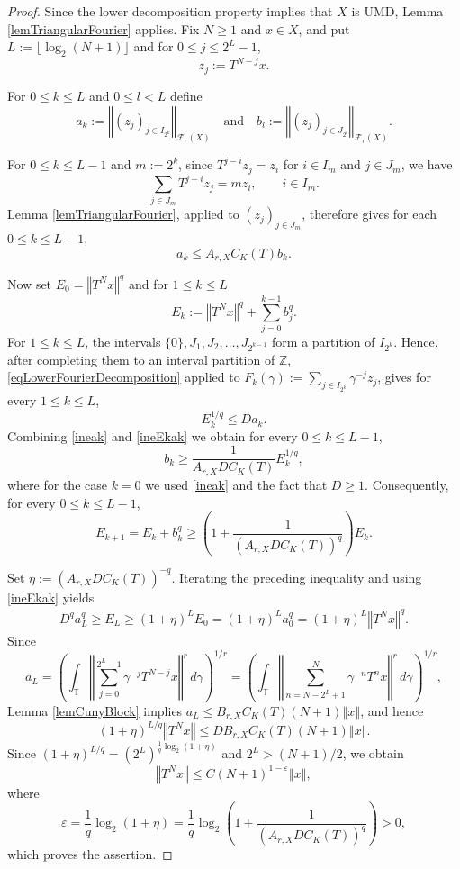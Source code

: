 \documentclass[12pt]{amsart}
\theoremstyle{plain}
\theoremstyle{remark}
\theoremstyle{definition}
\newcommand{\Z}{\mathbb{Z}}
\newcommand{\T}{\mathbb{T}}
\newcommand{\norm}[1]{\left\Vert #1\right\Vert}
\begin{document}
	\begin{proof}
		Since the lower decomposition property implies that $X$ is UMD, Lemma
		\ref{lemTriangularFourier} applies. Fix $N\ge1$ and
		$x\in X$, and put $
		L:=\lfloor\log_2(N+1)\rfloor$ and for $0\le j\le2^L-1$, 
		\[
		z_j:=T^{N-j}x.
		\]
		
		For $0\le k\le L$ and $0\le l< L$ define 
		\[
		a_k
		:=
		\norm{(z_j)_{j\in I_{2^k}}}_{\mathcal F_r(X)}
		\quad \text{and} \quad 
		b_l
		:=
		\norm{(z_j)_{j\in J_{2^l}}}_{\mathcal F_r(X)}.
		\]
		
		For $0\le k\le L-1$ and $m:=2^k$, since
		$T^{j-i}z_j=z_i$ for $i\in I_m$ and $j\in J_m$, we have
		\[
		\sum_{j\in J_m}T^{j-i}z_j=mz_i,
		\qquad i\in I_m.
		\]
		Lemma \ref{lemTriangularFourier}, applied to
		$(z_j)_{j\in J_m}$, therefore gives for each $0\le k \le L-1 $,
		\begin{equation}\label{ineak}
			a_k\le A_{r,X}C_K(T) b_k.
		\end{equation}
		
		Now set $E_0 = \norm{T^Nx}^q$ and for $1 \le k \le L $
		\[
		E_k
		:=
		\norm{T^Nx}^q+\sum_{j=0}^{k-1}b_j^q.
		\]
		For $1\le k\le L$, the intervals $
		\{0\},J_1,J_2,\ldots,J_{2^{k-1}}
		$
		form a partition of $I_{2^k}$. Hence, after completing them to an interval
		partition of $\Z$, \eqref{eqLowerFourierDecomposition} applied to
		$
		F_k(\gamma)
		:=
		\sum_{j\in I_{2^k}}\gamma^{-j}z_j$,
		gives  for every $1\le k \le L$,
		\begin{equation}\label{ineEkak}
			E_k^{1/q}\le Da_k.
		\end{equation}
		Combining \eqref{ineak} and \eqref{ineEkak} 
		we obtain for every $0\le k \le L-1$, 
		\[
		b_k
		\ge
		\frac{1}{A_{r,X}DC_K(T)}E_k^{1/q},
		\]
		where for the case $k=0$ we used \eqref{ineak} and the fact that $D\ge 1$. Consequently, for every $0\le k \le L-1$,
		\[
		E_{k+1}
		=
		E_k+b_k^q
		\ge
		\left(
		1+\frac{1}{(A_{r,X}DC_K(T))^q}
		\right)E_k.
		\]
		
		Set $\eta:=(A_{r,X}DC_K(T))^{-q}$. Iterating the preceding inequality and using   \eqref{ineEkak} yields
		\begin{align*}
			D^qa_L^q \ge E_L
			\ge
			(1+\eta)^{L}E_0 
			=(1+\eta)^La_0^q =
			(1+\eta)^L\norm{T^Nx}^q.
		\end{align*}
		Since
		\[
		a_L
		=
		\left(
		\int_{\T}
		\norm{
			\sum_{j=0}^{2^L-1}\gamma^{-j}T^{N-j}x
		}^r\,d\gamma
		\right)^{1/r} = \left(
		\int_{\T}
		\norm{
			\sum_{n=N-2^L+1}^{N}\gamma^{-n}T^nx
		}^r\,d\gamma
		\right)^{1/r},
		\]
		Lemma \ref{lemCunyBlock} implies
		$a_L\le B_{r,X}C_K(T)(N+1)\norm{x}$, and hence
		\[
		(1+\eta)^{L/q}\norm{T^Nx}
		\le
		DB_{r,X}C_K(T)(N+1)\norm{x}.
		\]
		Since $
		(1+\eta)^{L/q}
		=
		(2^L)^{\frac1q\log_2(1+\eta)}$
		and $2^L>(N+1)/2$, we obtain
		\[
		\norm{T^Nx}
		\le
		C(N+1)^{1-\varepsilon}\norm{x},
		\]
		where
		\[
		\varepsilon
		=
		\frac1q\log_2(1+\eta)
		=
		\frac1q\log_2\left(
		1+\frac{1}{(A_{r,X}DC_K(T))^q}
		\right)>0,
		\]
		which proves the assertion.
	\end{proof}
	
\end{document}
